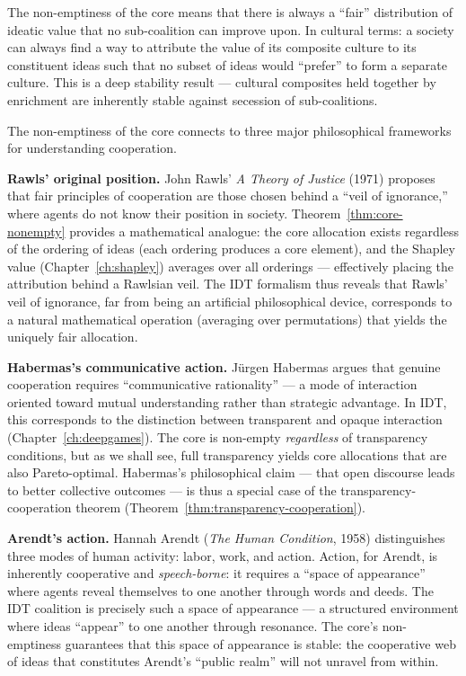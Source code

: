 \begin{interpretation}
The non-emptiness of the core means that there is always a ``fair''
distribution of ideatic value that no sub-coalition can improve upon.  In
cultural terms: a society can always find a way to attribute the value of its
composite culture to its constituent ideas such that no subset of ideas would
``prefer'' to form a separate culture.  This is a deep stability result ---
cultural composites held together by enrichment are inherently stable against
secession of sub-coalitions.
\end{interpretation}

\begin{interpretation}
\label{interp:ch15:rawls_habermas_arendt}
The non-emptiness of the core connects to three major philosophical
frameworks for understanding cooperation.

\textbf{Rawls' original position.}  John Rawls' \textit{A Theory of Justice}
(1971) proposes that fair principles of cooperation are those chosen behind a
``veil of ignorance,'' where agents do not know their position in society.
Theorem~\ref{thm:core-nonempty} provides a mathematical analogue: the core
allocation exists regardless of the ordering of ideas (each ordering produces
a core element), and the Shapley value (Chapter~\ref{ch:shapley}) averages
over all orderings --- effectively placing the attribution behind a Rawlsian
veil.  The IDT formalism thus reveals that Rawls' veil of ignorance, far from
being an artificial philosophical device, corresponds to a natural mathematical
operation (averaging over permutations) that yields the uniquely fair
allocation.

\textbf{Habermas's communicative action.}  J\"urgen Habermas argues that
genuine cooperation requires ``communicative rationality'' --- a mode of
interaction oriented toward mutual understanding rather than strategic
advantage.  In IDT, this corresponds to the distinction between transparent
and opaque interaction (Chapter~\ref{ch:deepgames}).  The core is non-empty
\emph{regardless} of transparency conditions, but as we shall see, full
transparency yields core allocations that are also Pareto-optimal.  Habermas's
philosophical claim --- that open discourse leads to better collective
outcomes --- is thus a special case of the transparency-cooperation theorem
(Theorem~\ref{thm:transparency-cooperation}).

\textbf{Arendt's action.}  Hannah Arendt (\textit{The Human Condition}, 1958)
distinguishes three modes of human activity: labor, work, and action.  Action,
for Arendt, is inherently cooperative and \emph{speech-borne}: it requires
a ``space of appearance'' where agents reveal themselves to one another through
words and deeds.  The IDT coalition is precisely such a space of appearance ---
a structured environment where ideas ``appear'' to one another through
resonance.  The core's non-emptiness guarantees that this space of appearance
is stable: the cooperative web of ideas that constitutes Arendt's ``public
realm'' will not unravel from within.
\end{interpretation}

